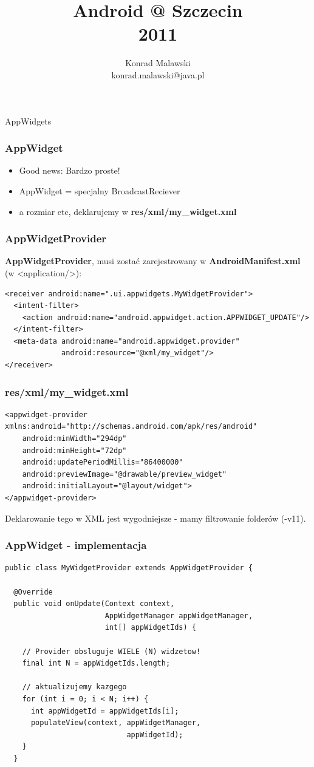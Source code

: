 \documentclass{beamer}
\title{Android @ Szczecin \\ 2011}
\author{Konrad Malawski \\ konrad.malawski@java.pl}
\begin{document}
\begin{frame}
 \begin{center}
  \Huge{AppWidgets}
 \end{center}
\end{frame}

\begin{frame}\frametitle{AppWidget}
\begin{itemize}
 \item Good news: Bardzo proste!
 \item AppWidget = specjalny BroadcastReciever
 \item a rozmiar etc, deklarujemy w \textbf{res/xml/my\_widget.xml}
\end{itemize}
\end{frame}


\begin{frame}[fragile]\frametitle{AppWidgetProvider}
\textbf{AppWidgetProvider}, musi zostać zarejestrowany w \textbf{AndroidManifest.xml} (w <application/>):
\begin{lstlisting}
<receiver android:name=".ui.appwidgets.MyWidgetProvider">
  <intent-filter>
    <action android:name="android.appwidget.action.APPWIDGET_UPDATE"/>
  </intent-filter>
  <meta-data android:name="android.appwidget.provider"
             android:resource="@xml/my_widget"/>
</receiver>
\end{lstlisting}
\end{frame}

\begin{frame}[fragile]\frametitle{res/xml/\textbf{my\_widget.xml}}
\begin{lstlisting}
<appwidget-provider xmlns:android="http://schemas.android.com/apk/res/android"
    android:minWidth="294dp"
    android:minHeight="72dp"
    android:updatePeriodMillis="86400000"
    android:previewImage="@drawable/preview_widget"
    android:initialLayout="@layout/widget">
</appwidget-provider>
\end{lstlisting}
Deklarowanie tego w XML jest wygodniejsze - mamy filtrowanie folderów (-v11).
\end{frame}



\begin{frame}[fragile]\frametitle{AppWidget - implementacja}
\begin{lstlisting}
public class MyWidgetProvider extends AppWidgetProvider {

  @Override
  public void onUpdate(Context context, 
                       AppWidgetManager appWidgetManager, 
                       int[] appWidgetIds) {

    // Provider obsluguje WIELE (N) widzetow!
    final int N = appWidgetIds.length;

    // aktualizujemy kazgego
    for (int i = 0; i < N; i++) {
      int appWidgetId = appWidgetIds[i];
      populateView(context, appWidgetManager, 
                            appWidgetId);
    }
  }
\end{lstlisting}
\end{frame}
\end{document}
